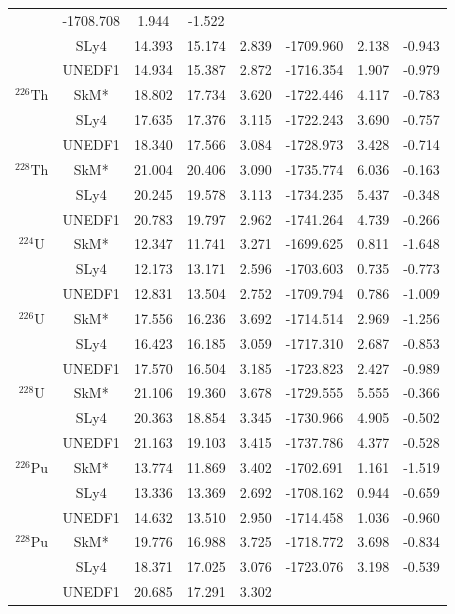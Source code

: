 \documentclass[11pt]{article}
\begin{document}
\begin{table}[htbp]
{\begin{tabular}{cccccccc}
 & -1708.708 & 1.944
& -1.522  \\
 & SLy4 & 14.393 & 15.174 & 2.839
 & -1709.960& 2.138 & -0.943  \\
 & UNEDF1 & 14.934 & 15.387 & 2.872
 & -1716.354& 1.907 & -0.979  \\
%
$^{226}\text{Th}$ & SkM* & 18.802 & 17.734  & 3.620
 & -1722.446 & 4.117
& -0.783  \\
 & SLy4 & 17.635 & 17.376 & 3.115
 & -1722.243& 3.690 & -0.757  \\
 & UNEDF1 & 18.340 & 17.566 & 3.084
 & -1728.973& 3.428 & -0.714  \\
%
$^{228}\text{Th}$ & SkM* & 21.004 & 20.406  & 3.090
 & -1735.774 & 6.036
& -0.163  \\
 & SLy4 & 20.245 & 19.578 & 3.113
 & -1734.235& 5.437 & -0.348  \\
 & UNEDF1 & 20.783 & 19.797 & 2.962
 & -1741.264& 4.739 & -0.266  \\
[5pt]
$^{224}\text{U}$ & SkM* & 12.347 & 11.741  & 3.271
 & -1699.625 & 0.811
& -1.648  \\
 & SLy4 & 12.173 & 13.171 & 2.596
 & -1703.603& 0.735 & -0.773  \\
 & UNEDF1 & 12.831 & 13.504 & 2.752
 & -1709.794& 0.786 & -1.009  \\
%
$^{226}\text{U}$ & SkM* & 17.556 & 16.236  & 3.692
 & -1714.514 & 2.969
& -1.256  \\
 & SLy4 & 16.423 & 16.185 & 3.059
 & -1717.310& 2.687 & -0.853  \\
 & UNEDF1 & 17.570 & 16.504 & 3.185
 & -1723.823& 2.427 & -0.989  \\
%
$^{228}\text{U}$ & SkM* & 21.106 & 19.360  & 3.678
 & -1729.555 & 5.555
& -0.366  \\
 & SLy4 & 20.363 & 18.854 & 3.345
 & -1730.966& 4.905 & -0.502  \\
 & UNEDF1 & 21.163 & 19.103 & 3.415
 & -1737.786& 4.377 & -0.528  \\
[5pt]
$^{226}\text{Pu}$ & SkM* & 13.774 & 11.869  & 3.402
 & -1702.691 & 1.161
& -1.519  \\
 & SLy4 & 13.336 & 13.369 & 2.692
 & -1708.162& 0.944 & -0.659  \\
 & UNEDF1 & 14.632 & 13.510 & 2.950
 & -1714.458& 1.036 & -0.960  \\
%
$^{228}\text{Pu}$ & SkM* & 19.776 & 16.988  & 3.725
 & -1718.772 & 3.698
& -0.834  \\
 & SLy4 & 18.371 & 17.025 & 3.076
 & -1723.076& 3.198 & -0.539  \\
 & UNEDF1 & 20.685 & 17.291 & 3.302

\end{tabular}}
\end{table}
\end{document}
